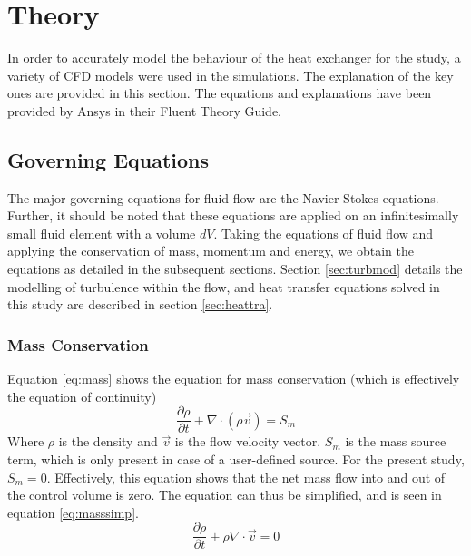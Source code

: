 \documentclass[11pt,a4paper,twoside,oneside]{article}
\begin{document}
\newpage

\clearpage
\thispagestyle{empty}

\cleardoublepage

\thispagestyle{plain}

\section{Theory}\label{sec:theory}
\vspace{.6cm}
In order to accurately model the behaviour of the heat exchanger for the study, a variety of CFD models were used in the simulations. The explanation of the key ones are provided in this section. The equations and explanations have been provided by Ansys in their Fluent Theory Guide\cite{fluth}.
\subsection{Governing Equations} \label{sec:goveq}
\vspace{0.3cm}
The major governing equations for fluid flow are the Navier-Stokes equations. Further, it should be noted that these equations are applied on  an infinitesimally small fluid element with a volume $dV$\cite{cfdintro}. Taking the equations of fluid flow and applying the conservation of mass, momentum and energy, we obtain the equations as detailed in the subsequent sections. Section \ref{sec:turbmod} details the modelling of turbulence within the flow, and heat transfer equations solved in this study are described in section \ref{sec:heattra}.

\subsubsection{Mass Conservation}

Equation \ref{eq:mass} shows the equation for mass conservation (which is effectively the equation of continuity)\cite{cfdintro}\cite{versteeg}
\begin{equation}
    \label{eq:mass}
    \frac{\partial \rho}{\partial t}+\nabla\cdot\left(\rho \vec{v}\right)=S_m
\end{equation}
Where $\rho$ is the density and $\vec{v}$ is the flow velocity vector. $S_m$ is the mass source term, which is only present in case of a user-defined source. For the present study, $S_m=0$. Effectively, this equation shows that the net mass flow into and out of the control volume is zero. The equation can thus be simplified, and is seen in equation \ref{eq:masssimp}.
\begin{equation}
    \label{eq:masssimp}
    \frac{\partial \rho}{\partial t}+\rho \nabla\cdot \vec{v}=0
\end{equation}
\end{document}
